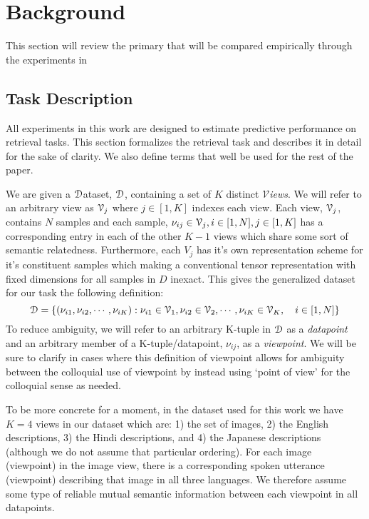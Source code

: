 \chapter{Background}
This section will review the primary \dftwrds that will be compared empirically through the experiments in 

\section{Task Description}
\label{section:task_defs}
All experiments in this work are designed to estimate predictive performance on retrieval tasks.
This section formalizes the retrieval task and describes it in detail for the sake of clarity.
We also define terms that well be used for the rest of the paper.

We are given a \underline{${\D}$}ataset, $\D$, containing a set of $K$ distinct \textit{\underline{$\mathcal{V}$}iews}.
We will refer to an arbitrary view as $\V[j]$ where $j\in[1,K]$ indexes each view.
Each view, $\V[j]$,  contains $N$ samples and each sample, $\nu_{ij} \in \V[j], i\in [1,N], j\in[1,K]$ has a corresponding entry in each of the other $K-1$ views which share some sort of semantic relatedness.
Furthermore, each $V_j$ has it's own representation scheme for it's constituent samples which making a conventional tensor representation with fixed dimensions for all samples in $D$ inexact.
This gives the generalized dataset for our task the following definition:
\begin{equation*}
    \D = \{(\nu_{i1}, \nu_{i2}, \cdots, \nu_{iK}) : \nu_{i1} \in \V[1], \nu_{i2} \in \V[2], \cdots, \nu_{iK} \in \V[K], \quad i \in [1,N]\}
\end{equation*}
To reduce ambiguity, we will refer to an arbitrary K-tuple in $\D$ as a \textit{datapoint} and an arbitrary member of a K-tuple/datapoint, $\nu_{ij}$, as a \textit{viewpoint}. 
We will be sure to clarify in cases where this definition of viewpoint allows for ambiguity between the colloquial use of viewpoint by instead using `point of view' for the colloquial sense as needed.

To be more concrete for a moment, in the dataset used for this work we have $K=4$ views in our dataset which are: 1) the set of images, 2) the English descriptions, 3) the Hindi descriptions, and 4) the Japanese descriptions (although we do not assume that particular ordering).
For each image (viewpoint) in the image view, there is a corresponding spoken utterance (viewpoint) describing that image in all three languages.
We therefore assume some type of reliable mutual semantic information between each viewpoint in all datapoints.

